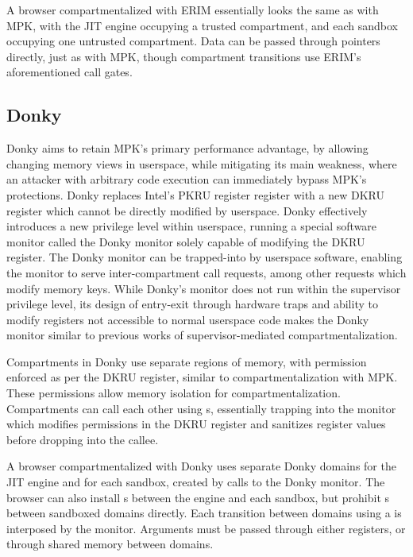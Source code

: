 A browser compartmentalized with ERIM essentially looks the same as with
MPK, with the JIT engine occupying a trusted compartment, and each sandbox
occupying one untrusted compartment. 
Data can be passed through pointers directly, just as with MPK, though 
compartment transitions use ERIM's aforementioned call gates.

\subsection{Donky}
Donky aims to retain MPK's primary performance advantage, by allowing
changing memory views in userspace, while mitigating its main weakness, 
where an attacker with arbitrary code execution can immediately bypass
MPK's protections.
Donky replaces Intel's PKRU register register with a new DKRU register
which cannot be directly modified by userspace.
Donky effectively introduces a new privilege level within userspace, 
running a special software monitor called the Donky monitor solely 
capable of modifying the DKRU register.
The Donky monitor can be trapped-into by userspace software, enabling the
monitor to serve inter-compartment call requests, among other requests
which modify memory keys.
While Donky's monitor does not run within the supervisor privilege level,
its design of entry-exit through hardware traps and ability to modify
registers not accessible to normal userspace code makes the Donky monitor
similar to previous works of supervisor-mediated compartmentalization.

Compartments in Donky use separate regions of memory, with permission
enforced as per the DKRU register, similar to compartmentalization with
MPK.
These permissions allow memory isolation for compartmentalization.
Compartments can call each other using s, essentially trapping
into the monitor which modifies permissions in the DKRU register and
sanitizes register values before dropping into the callee.

A browser compartmentalized with Donky uses separate Donky domains for the 
JIT engine and for each sandbox, created by calls to the Donky monitor.
The browser can also install s between the engine and each
sandbox, but prohibit s between sandboxed domains directly.
Each transition between domains using a  is interposed by the
monitor.
Arguments must be passed through either registers, or through shared memory
between domains.

